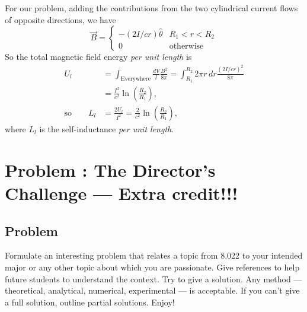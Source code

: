 \documentclass[solutions]{esg8022pset}
\begin{document}
  For our problem, adding the contributions from the two cylindrical
  current flows of opposite directions, we have
  \begin{equation}
    \vec{B} =
      \begin{cases}
        -(2I/cr) \hat{\theta} & R_1<r<R_2 \\
        0 & \text{otherwise}
      \end{cases}
  \end{equation}
  So the total magnetic field energy \emph{per unit length} is
  \begin{align*}
    U_{l} & = \int_{\text{Everywhere}} \frac{dV}{l} \frac{B^2}{8\pi}
      = \int_{R_1}^{R_2} 2\pi r\,dr \frac{(2I/cr)^2}{8\pi} \\
      & = \frac{I^2}{c^2}\ln\left(\frac{R_2}{R_1}\right),\\
    \text{so}\qquad L_{l} & = \frac{2U_{l}}{I^2}=\frac{2}{c^2}\ln{(\frac{R_2}{R_1})},
  \end{align*}
  where $L_{l}$ is the self-inductance \emph{per unit length}.
\section{Problem \thesection: The Director's Challenge --- Extra credit!!!}
\subsection{Problem}
  Formulate an interesting problem that relates a topic from 8.022 to your
  intended major or any other topic about which you are passionate.  Give
  references to help future students to understand the context.  Try to give a
  solution.  Any method --- theoretical, analytical, numerical, experimental
  --- is acceptable.  If you can't give a full solution, outline partial
  solutions. Enjoy!
\end{document}
